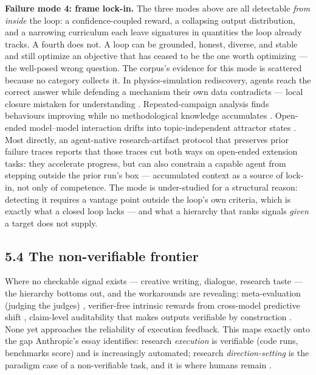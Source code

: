 \documentclass[
  11pt,
]{article}
\begin{document}
\textbf{Failure mode 4: frame lock-in.} The three modes above are all
detectable \emph{from inside} the loop: a confidence-coupled reward, a
collapsing output distribution, and a narrowing curriculum each leave
signatures in quantities the loop already tracks. A fourth does not. A
loop can be grounded, honest, diverse, and stable and still optimize an
objective that has ceased to be the one worth optimizing --- the
well-posed wrong question. The corpus's evidence for this mode is
scattered because no category collects it. In physics-simulation
rediscovery, agents reach the correct answer while defending a mechanism
their own data contradicts --- local closure mistaken for understanding
\citep{eulig2026position}. Repeated-campaign analysis finds behaviours
improving while no methodological knowledge accumulates
\citep{lin2026repeated}. Open-ended model--model interaction drifts into
topic-independent attractor states \citep{ko2026attractor}. Most
directly, an agent-native research-artifact protocol that preserves
prior failure traces reports that those traces cut both ways on
open-ended extension tasks: they accelerate progress, but can also
constrain a capable agent from stepping outside the prior run's box
\citep{liu2026last} --- accumulated context as a source of lock-in, not
only of competence. The mode is under-studied for a structural reason:
detecting it requires a vantage point outside the loop's own criteria,
which is exactly what a closed loop lacks --- and what a hierarchy that
ranks signals \emph{given} a target does not supply.

\subsection{5.4 The non-verifiable
frontier}\label{the-non-verifiable-frontier}

Where no checkable signal exists --- creative writing, dialogue,
research taste --- the hierarchy bottoms out, and the workarounds are
revealing: meta-evaluation (judging the judges)
\citep{sui2026conversation}, verifier-free intrinsic rewards from
cross-model predictive shift \citep{huang2026g}, claim-level
auditability that makes outputs verifiable by construction
\citep{rasheed2026fluent}. None yet approaches the reliability of
execution feedback. This maps exactly onto the gap Anthropic's essay
identifies: research \emph{execution} is verifiable (code runs,
benchmarks score) and is increasingly automated; research
\emph{direction-setting} is the paradigm case of a non-verifiable task,
and it is where humans remain \citep{anthropic2026rsi}.
\end{document}
